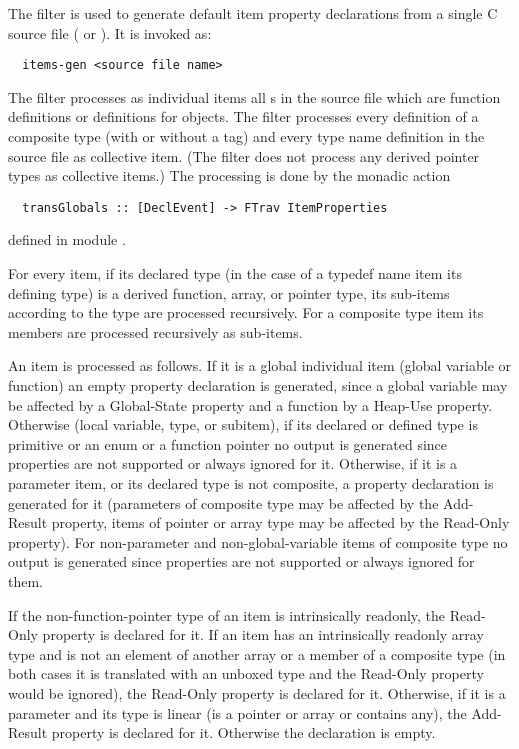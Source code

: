 The filter  is used to generate default item property declarations from a single C source file ( or ).
It is invoked as:
\begin{verbatim}
  items-gen <source file name>
\end{verbatim}

The filter processes as individual items all s in the source file which are function
definitions or definitions for objects. The filter processes every definition of a composite type 
(with or without a tag) and every type name definition in the source file as collective item. (The filter does not
process any derived pointer types as collective items.) The processing is done by the monadic action
\begin{verbatim}
  transGlobals :: [DeclEvent] -> FTrav ItemProperties
\end{verbatim}
defined in module .

For every item, if its declared type (in the case of a typedef name item its defining type) is
a derived function, array, or pointer type, its sub-items according to the 
type are processed recursively. For a composite type item its members are processed recursively as sub-items.

An item is processed as follows. If it is a global individual item (global variable or function) an empty property declaration
is generated, since a global variable may be affected by a Global-State property and a function by a Heap-Use property. 
Otherwise (local variable, type, or subitem), if its declared or defined type is primitive or an enum
or a function pointer no output is generated since properties are not supported or always ignored for it. Otherwise, if it
is a parameter item, or its declared type is not composite, a property declaration is generated for it (parameters of composite
type may be affected by the Add-Result property, items of pointer or array type may be affected by the Read-Only property).
For non-parameter and non-global-variable items of composite type no output is generated since properties are not 
supported or always ignored for them.

If the non-function-pointer type of an item is intrinsically readonly, the Read-Only property is declared for it. If an 
item has an intrinsically readonly array type and is not an element of another array or a member of a composite type (in both
cases it is translated with an unboxed type and the Read-Only property would be ignored), the Read-Only property
is declared for it. Otherwise, if it is a parameter and its type is linear (is a pointer or array or contains any),
the Add-Result property is declared for it. Otherwise the declaration is empty.


